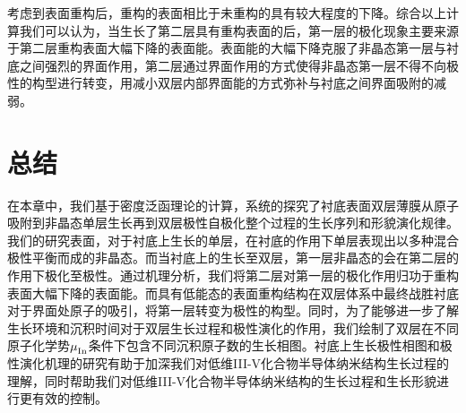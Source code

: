 考虑到表面重构后，重构的表面相比于未重构的具有较大程度的下降。综合以上计算我们可以认为，当生长了第二层具有重构表面的后，第一层的极化现象主要来源于第二层重构表面大幅下降的表面能。表面能的大幅下降克服了非晶态第一层与衬底之间强烈的界面作用，第二层通过界面作用的方式使得非晶态第一层不得不向极性的构型进行转变，用减小双层内部界面能的方式弥补与衬底之间界面吸附的减弱。

\section{总结}
在本章中，我们基于密度泛函理论的计算，系统的探究了衬底表面双层薄膜从原子吸附到非晶态单层生长再到双层极性自极化整个过程的生长序列和形貌演化规律。我们的研究表面，对于衬底上生长的单层，在衬底的作用下单层表现出以多种混合极性平衡而成的非晶态。而当衬底上的生长至双层，第一层非晶态的会在第二层的作用下极化至极性。通过机理分析，我们将第二层对第一层的极化作用归功于重构表面大幅下降的表面能。而具有低能态的表面重构结构在双层体系中最终战胜衬底对于界面处原子的吸引，将第一层转变为极性的构型。同时，为了能够进一步了解生长环境和沉积时间对于双层生长过程和极性演化的作用，我们绘制了双层在不同原子化学势$\it \mu_{\rm In}^{\rm } \it$条件下包含不同沉积原子数的生长相图。衬底上生长极性相图和极性演化机理的研究有助于加深我们对低维III-V化合物半导体纳米结构生长过程的理解，同时帮助我们对低维III-V化合物半导体纳米结构的生长过程和生长形貌进行更有效的控制。